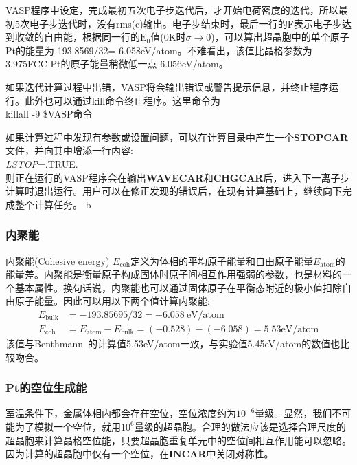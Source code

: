 \textrm{VASP}程序中设定，完成最初五次电子步迭代后，才开始电荷密度的迭代，所以最初5次电子步迭代时，没有\textrm{rms(c)}输出。电子步结束时，最后一行的\textrm{F}表示电子步达到收敛的自由能，根据同一行的$\mathrm{E}_0$值(0\textrm{K}时$\sigma\rightarrow0$)，可以算出超晶胞中的单个原子\textrm{Pt}的能量为-193.8569/32=-6.058\textrm{eV/atom}。不难看出，该值比晶格参数为3.975\textrm{FCC-Pt}的原子能量稍微低一点-6.056\textrm{eV/atom}。

如果迭代计算过程中出错，\textrm{VASP}将会输出错误或警告提示信息，并终止程序运行。此外也可以通过\textrm{kill}命令终止程序。这里命令为\\
\textrm{killall -9 \$VASP命令}

如果计算过程中发现有参数或设置问题，可以在计算目录中产生一个\textbf{STOPCAR}文件，并向其中增添一行内容:~\\
\textit{LSTOP}=\textrm{.TRUE.}\\
则正在运行的\textrm{VASP}程序会在输出\textbf{WAVECAR}和\textbf{CHGCAR}后，进入下一离子步计算时退出运行。用户可以在修正发现的错误后，在现有计算基础上，继续向下完成整个计算任务。
b


\subsubsection{内聚能}
内聚能\textrm{(Cohesive energy) $E_{\mathrm{coh}}$}定义为体相的平均原子能量和自由原子能量$E_{\mathrm{atom}}$的能量差。内聚能是衡量原子构成固体时原子间相互作用强弱的参数，也是材料的一个基本属性。换句话说，内聚能也可以通过固体原子在平衡态附近的极小值扣除自由原子能量。因此可以用以下两个值计算内聚能:~
\begin{displaymath}
	\begin{aligned}
		E_{\mathrm{bulk}}&=-193.85695/32=-6.058~\mathrm{eV/atom}\\
		E_{\mathrm{coh}}&=E_{\mathrm{atom}}-E_{\mathrm{bulk}}=(-0.528)-(-6.058)=5.53\mathrm{eV/atom}
	\end{aligned}
\end{displaymath}
该值与\textrm{Benthmann}~的计算值5.53\textrm{eV/atom}一致，与实验值5.45\textrm{eV/atom}的数值也比较吻合。
\subsubsection{\rm{Pt}的空位生成能}
室温条件下，金属体相内都会存在空位，空位浓度约为$10^{-6}$量级。显然，我们不可能为了模拟一个空位，就用$10^6$量级的超晶胞。合理的做法应该是选择合理尺度的超晶胞来计算晶格空位能，只要超晶胞重复单元中的空位间相互作用能可以忽略。因为计算的超晶胞中仅有一个空位，在\textbf{INCAR}中关闭对称性。

